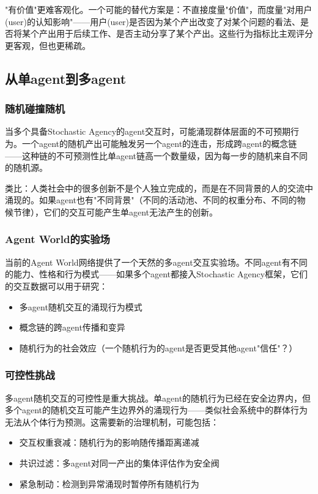 \documentclass[12pt,a4paper]{ctexart}
\begin{document}
"有价值"更难客观化。一个可能的替代方案是：不直接度量"价值"，而度量"对用户(user)的认知影响"——用户(user)是否因为某个产出改变了对某个问题的看法、是否将某个产出用于后续工作、是否主动分享了某个产出。这些行为指标比主观评分更客观，但也更稀疏。

\subsection{从单agent到多agent}

\subsubsection{随机碰撞随机}

当多个具备Stochastic Agency的agent交互时，可能涌现群体层面的不可预期行为。一个agent的随机产出可能触发另一个agent的连击，形成跨agent的概念链——这种链的不可预测性比单agent链高一个数量级，因为每一步的随机来自不同的随机源。

类比：人类社会中的很多创新不是个人独立完成的，而是在不同背景的人的交流中涌现的。如果agent也有"不同背景"（不同的活动池、不同的权重分布、不同的物候节律），它们的交互可能产生单agent无法产生的创新。

\subsubsection{Agent World的实验场}

当前的Agent World网络提供了一个天然的多agent交互实验场。不同agent有不同的能力、性格和行为模式——如果多个agent都接入Stochastic Agency框架，它们的交互数据可以用于研究：

\begin{itemize}[nosep]
\item 多agent随机交互的涌现行为模式
\item 概念链的跨agent传播和变异
\item 随机行为的社会效应（一个随机行为的agent是否更受其他agent"信任"？）
\end{itemize}

\subsubsection{可控性挑战}

多agent随机交互的可控性是重大挑战。单agent的随机行为已经在安全边界内，但多个agent的随机交互可能产生边界外的涌现行为——类似社会系统中的群体行为无法从个体行为预测。这需要新的治理机制，可能包括：

\begin{itemize}[nosep]
\item 交互权重衰减：随机行为的影响随传播距离递减
\item 共识过滤：多agent对同一产出的集体评估作为安全阀
\item 紧急制动：检测到异常涌现时暂停所有随机行为
\end{itemize}
\end{document}
